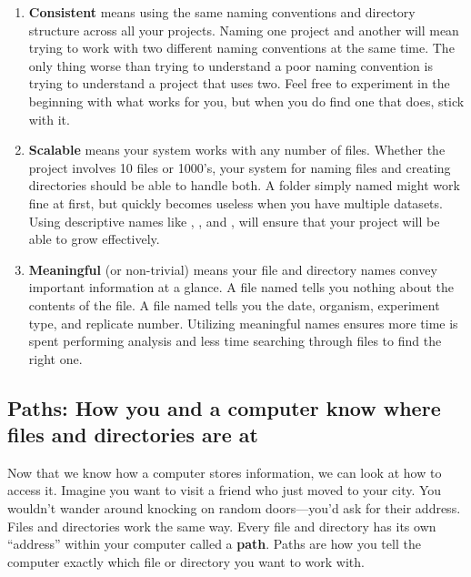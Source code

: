 \begin{enumerate}
    \item \textbf{Consistent} means using the same naming conventions and directory structure across all your projects. Naming one project  and another  will mean trying to work with two different naming conventions at the same time. The only thing worse than trying to understand a poor naming convention is trying to understand a project that uses two. Feel free to experiment in the beginning with what works for you, but when you do find one that does, stick with it.

    \item \textbf{Scalable} means your system works with any number of files. Whether the project involves 10 files or 1000's, your system for naming files and creating directories should be able to handle both. A folder simply named  might work fine at first, but quickly becomes useless when you have multiple datasets. Using descriptive names like , , and , will ensure that your project will be able to grow effectively.

    \item \textbf{Meaningful} (or non-trivial) means your file and directory names convey important information at a glance. A file named  tells you nothing about the contents of the file. A file named  tells you the date, organism, experiment type, and replicate number. Utilizing meaningful names ensures more time is spent performing analysis and less time searching through files to find the right one.
\end{enumerate}

\subsection{Paths: How you and a computer know where files and directories are at}

Now that we know how a computer stores information, we can look at how to access it. Imagine you want to visit a friend who just moved to your city. You wouldn't wander around knocking on random doors---you'd ask for their address. Files and directories work the same way. Every file and directory has its own ``address'' within your computer called a \textbf{path}. Paths are how you tell the computer exactly which file or directory you want to work with.

